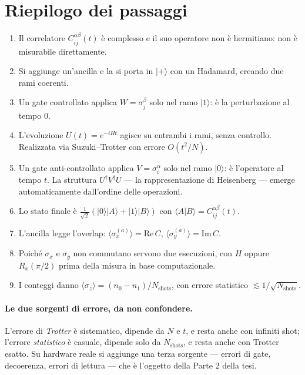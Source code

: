 \documentclass[11pt,a4paper]{article}
\begin{document}
\section{Riepilogo dei passaggi}

\begin{enumerate}[leftmargin=*]
\item Il correlatore $C_{ij}^{\alpha\beta}(t)$ è complesso e il suo operatore non è hermitiano:
non è misurabile direttamente.
\item Si aggiunge un'ancilla e la si porta in $|+\rangle$ con un Hadamard, creando due rami
coerenti.
\item Un gate controllato applica $W=\sigma_j^\beta$ solo nel ramo $|1\rangle$: è la
perturbazione al tempo $0$.
\item L'evoluzione $U(t)=e^{-iHt}$ agisce su entrambi i rami, senza controllo. Realizzata via
Suzuki--Trotter con errore $O(t^2/N)$.
\item Un gate anti-controllato applica $V=\sigma_i^\alpha$ solo nel ramo $|0\rangle$: è
l'operatore al tempo $t$. La struttura $U^\dagger V^\dagger U$ --- la rappresentazione di
Heisenberg --- emerge automaticamente dall'ordine delle operazioni.
\item Lo stato finale è $\tfrac{1}{\sqrt2}(|0\rangle|A\rangle+|1\rangle|B\rangle)$ con
$\langle A|B\rangle=C_{ij}^{\alpha\beta}(t)$.
\item L'ancilla legge l'overlap: $\langle\sigma_x^{(a)}\rangle=\mathrm{Re}\,C$,
$\langle\sigma_y^{(a)}\rangle=\mathrm{Im}\,C$.
\item Poiché $\sigma_x$ e $\sigma_y$ non commutano servono due esecuzioni, con $H$ oppure
$R_x(\pi/2)$ prima della misura in base computazionale.
\item I conteggi danno $\langle\sigma_z\rangle=(n_0-n_1)/N_{\text{shots}}$, con errore
statistico $\lesssim1/\sqrt{N_{\text{shots}}}$.
\end{enumerate}

\paragraph{Le due sorgenti di errore, da non confondere.}
L'errore di \emph{Trotter} è sistematico, dipende da $N$ e $t$, e resta anche con infiniti shot;
l'errore \emph{statistico} è casuale, dipende solo da $N_{\text{shots}}$, e resta anche con
Trotter esatto. Su hardware reale si aggiunge una terza sorgente --- errori di gate,
decoerenza, errori di lettura --- che è l'oggetto della Parte 2 della tesi.
\end{document}
